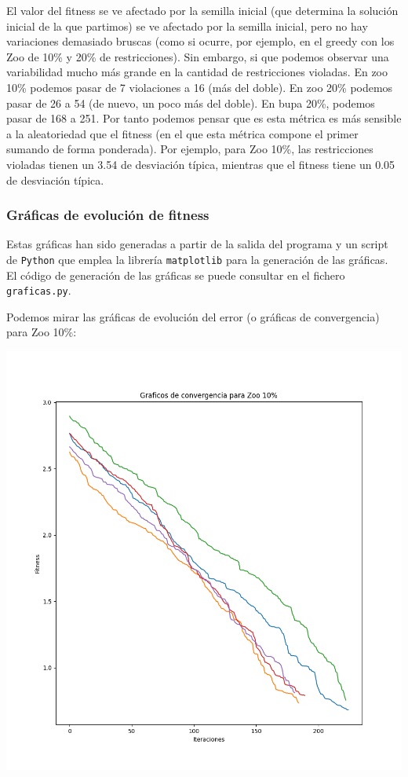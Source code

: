 \documentclass[11pt]{article}
\begin{document}
El valor del fitness se ve afectado por la semilla inicial (que determina la solución inicial de la que partimos) se ve afectado por la semilla inicial, pero no hay variaciones demasiado bruscas (como si ocurre, por ejemplo, en el greedy con los Zoo de 10\% y 20\% de restricciones). Sin embargo, si que podemos observar una variabilidad mucho más grande en la cantidad de restricciones violadas. En zoo 10\% podemos pasar de 7 violaciones a 16 (más del doble). En zoo 20\% podemos pasar de 26 a 54 (de nuevo, un poco más del doble). En bupa 20\%, podemos pasar de 168 a 251. Por tanto podemos pensar que es esta métrica es más sensible a la aleatoriedad que el fitness (en el que esta métrica compone el primer sumando de forma ponderada). Por ejemplo, para Zoo 10\%, las restricciones violadas tienen un
3.54 de desviación típica, mientras que el fitness tiene un 0.05 de desviación típica.

\subsubsection{Gráficas de evolución de fitness}

Estas gráficas han sido generadas a partir de la salida del programa y un script de \lstinline{Python} que emplea la librería \lstinline{matplotlib} para la generación de las gráficas. El código de generación de las gráficas se puede consultar en el fichero \lstinline{graficas.py}.

Podemos mirar las gráficas de evolución del error (o gráficas de convergencia) para Zoo 10\%:

\includegraphics[scale=0.5]{convergencia_zoo_10}
\end{document}
